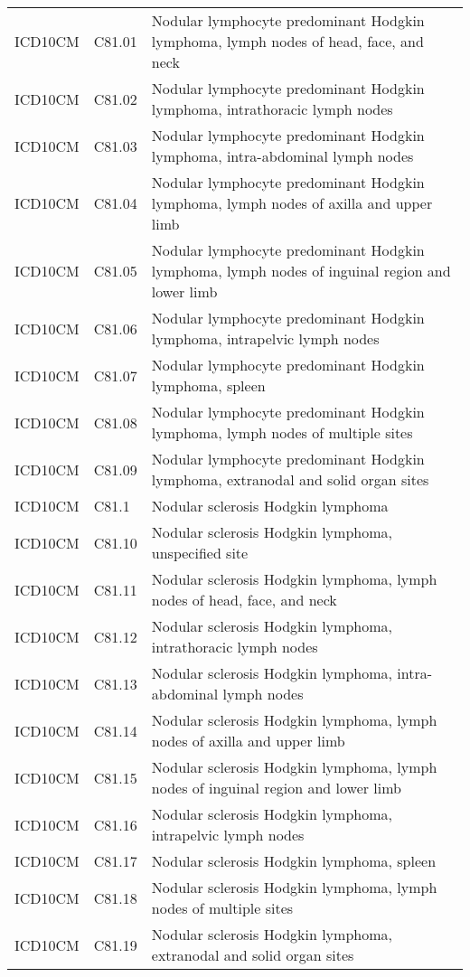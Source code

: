 \begin{longtable}{p{}p{}p{}}
  ICD10CM & C81.01 & Nodular lymphocyte predominant Hodgkin lymphoma, lymph nodes of head, face, and neck \\ 
  ICD10CM & C81.02 & Nodular lymphocyte predominant Hodgkin lymphoma, intrathoracic lymph nodes \\ 
  ICD10CM & C81.03 & Nodular lymphocyte predominant Hodgkin lymphoma, intra-abdominal lymph nodes \\ 
  ICD10CM & C81.04 & Nodular lymphocyte predominant Hodgkin lymphoma, lymph nodes of axilla and upper limb \\ 
  ICD10CM & C81.05 & Nodular lymphocyte predominant Hodgkin lymphoma, lymph nodes of inguinal region and lower limb \\ 
  ICD10CM & C81.06 & Nodular lymphocyte predominant Hodgkin lymphoma, intrapelvic lymph nodes \\ 
  ICD10CM & C81.07 & Nodular lymphocyte predominant Hodgkin lymphoma, spleen \\ 
  ICD10CM & C81.08 & Nodular lymphocyte predominant Hodgkin lymphoma, lymph nodes of multiple sites \\ 
  ICD10CM & C81.09 & Nodular lymphocyte predominant Hodgkin lymphoma, extranodal and solid organ sites \\ 
  ICD10CM & C81.1 & Nodular sclerosis Hodgkin lymphoma \\ 
  ICD10CM & C81.10 & Nodular sclerosis Hodgkin lymphoma, unspecified site \\ 
  ICD10CM & C81.11 & Nodular sclerosis Hodgkin lymphoma, lymph nodes of head, face, and neck \\ 
  ICD10CM & C81.12 & Nodular sclerosis Hodgkin lymphoma, intrathoracic lymph nodes \\ 
  ICD10CM & C81.13 & Nodular sclerosis Hodgkin lymphoma, intra-abdominal lymph nodes \\ 
  ICD10CM & C81.14 & Nodular sclerosis Hodgkin lymphoma, lymph nodes of axilla and upper limb \\ 
  ICD10CM & C81.15 & Nodular sclerosis Hodgkin lymphoma, lymph nodes of inguinal region and lower limb \\ 
  ICD10CM & C81.16 & Nodular sclerosis Hodgkin lymphoma, intrapelvic lymph nodes \\ 
  ICD10CM & C81.17 & Nodular sclerosis Hodgkin lymphoma, spleen \\ 
  ICD10CM & C81.18 & Nodular sclerosis Hodgkin lymphoma, lymph nodes of multiple sites \\ 
  ICD10CM & C81.19 & Nodular sclerosis Hodgkin lymphoma, extranodal and solid organ sites \\ 

\end{longtable}
